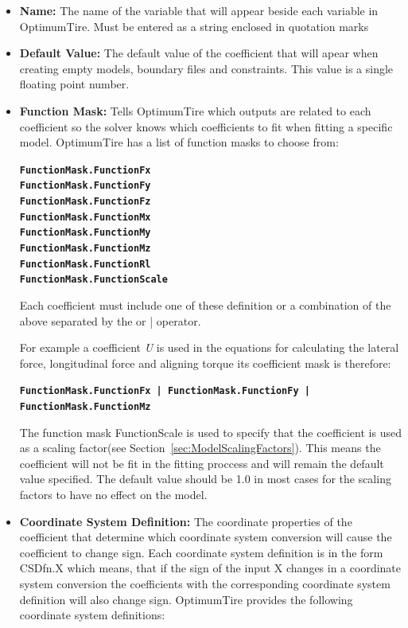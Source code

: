 \begin{itemize}
\item	\textbf{Name:} The name of the variable that will appear beside each variable in OptimumTire.  Must be entered as a string enclosed in quotation marks \textquotedbl \textquotedbl
\item	\textbf{Default Value:} The default value of the coefficient that will apear when creating empty models, boundary files and constraints. This value is a single floating point number.
\item \textbf{Function Mask:} Tells OptimumTire which outputs are related to each coefficient so the solver knows which coefficients to fit when fitting a specific model. OptimumTire has a list of function masks to choose from:


\begin{center}

\texttt{\textbf{FunctionMask.FunctionFx \\
FunctionMask.FunctionFy \\
FunctionMask.FunctionFz \\
FunctionMask.FunctionMx \\
FunctionMask.FunctionMy \\
FunctionMask.FunctionMz \\
FunctionMask.FunctionRl \\
FunctionMask.FunctionScale}}
\end{center}

Each coefficient must include one of these definition or a combination of the above separated by the or \textquotedbl | \textquotedbl operator. 

For example a coefficient \textsl{\textquotedbl U\textquotedbl} is used in the equations for calculating the lateral force, longitudinal force and aligning torque its coefficient mask is therefore:

\texttt{\textbf{FunctionMask.FunctionFx | FunctionMask.FunctionFy | FunctionMask.FunctionMz}}

The function mask FunctionScale is used to specify that the coefficient is used as a scaling factor(see Section~\ref{sec:ModelScalingFactors}). This means the coefficient will not be fit in the fitting proccess and will remain the default value specified. The default value should be 1.0 in most cases for the scaling factors to have no effect on the model.

\item \textbf{Coordinate System Definition:} The coordinate properties of the coefficient that determine which coordinate system conversion will cause the coefficient to change sign. Each coordinate system definition is in the form CSDfn.X which means, that if the sign of the input X changes in a coordinate system  conversion the coefficients with the corresponding coordinate system definition will also change sign. OptimumTire provides the following coordinate system definitions:
 	

\end{itemize}
